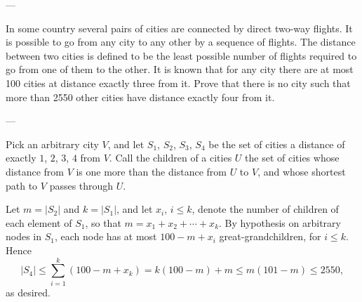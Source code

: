 
---

In some country several pairs of cities are connected by direct two-way flights. It is possible to go from any city to any other by a sequence of flights. The distance between two cities is defined to be the least possible number of flights required to go from one of them to the other. It is known that for any city there are at most 100 cities at distance exactly three from it. Prove that there is no city such that more than 2550 other cities have distance exactly four from it.

---

Pick an arbitrary city $V$, and let $S_1$, $S_2$, $S_3$, $S_4$ be the set of cities a distance of exactly $1$, $2$, $3$, $4$ from $V$. Call the children of a cities $U$ the set of cities whose distance from $V$ is one more than the distance from $U$ to $V$, and whose shortest path to $V$ passes through $U$.

Let $m=|S_2|$ and $k=|S_1|$, and let $x_i$, $i\le k$, denote the number of children of each element of $S_1$, so that $m=x_1+x_2+\cdots+x_k$. By hypothesis on arbitrary nodes in $S_1$, each node has at most $100-m+x_i$ great-grandchildren, for $i\le k$. Hence \[|S_4|\le\sum_{i=1}^k(100-m+x_k)=k(100-m)+m\le m(101-m)\le2550,\]
as desired.
